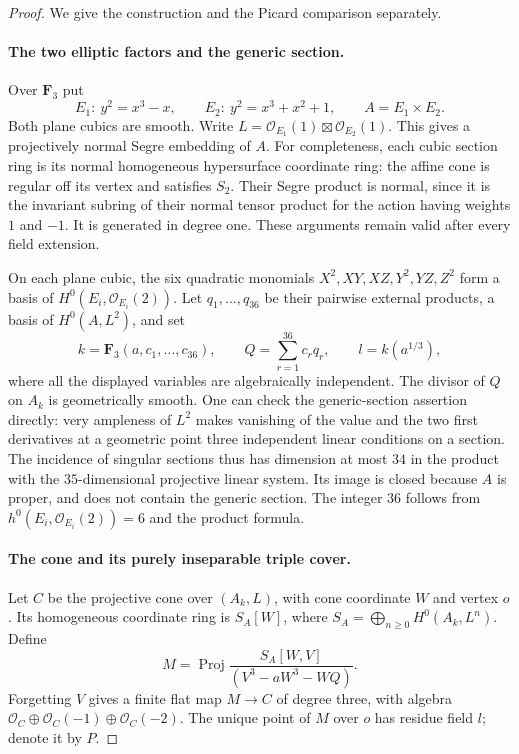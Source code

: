 \begin{proof}
We give the construction and the Picard comparison separately.

\paragraph{The two elliptic factors and the generic section.}
Over $\mathbf F_3$ put
\[
 E_1:\ y^2=x^3-x,\qquad
 E_2:\ y^2=x^3+x^2+1,
 \qquad A=E_1\times E_2.
\]
Both plane cubics are smooth.  Write
$L=\mathcal O_{E_1}(1)\boxtimes\mathcal O_{E_2}(1)$.
This gives a projectively normal Segre embedding of $A$.
For completeness, each cubic section ring is its normal
homogeneous hypersurface coordinate ring: the affine cone is
regular off its vertex and satisfies $S_2$.  Their Segre product
is normal, since it is the invariant subring of their normal
tensor product for the action having weights $1$ and $-1$.
It is generated in degree one.  These arguments remain valid
after every field extension.

On each plane cubic, the six quadratic monomials
$X^2,XY,XZ,Y^2,YZ,Z^2$ form a basis of
$H^0(E_i,\mathcal O_{E_i}(2))$.  Let
$q_1,\ldots,q_{36}$ be their pairwise external products,
a basis of $H^0(A,L^2)$, and set
\[
 k=\mathbf F_3(a,c_1,\ldots,c_{36}),\qquad
 Q=\sum_{r=1}^{36}c_rq_r,
 \qquad l=k(a^{1/3}),
\]
where all the displayed variables are algebraically independent.
The divisor of $Q$ on $A_k$ is geometrically smooth.  One can
check the generic-section assertion directly: very ampleness of
$L^2$ makes vanishing of the value and the two first derivatives
at a geometric point three independent linear conditions on a
section.  The incidence of singular sections thus has dimension
at most $34$ in the product with the $35$-dimensional projective
linear system.  Its image is closed because $A$ is proper, and
does not contain the generic section.  The integer $36$ follows
from $h^0(E_i,\mathcal O_{E_i}(2))=6$ and the product formula.

\paragraph{The cone and its purely inseparable triple cover.}
Let $C$ be the projective cone over $(A_k,L)$, with cone coordinate
$W$ and vertex $o$.  Its homogeneous coordinate ring is
$S_A[W]$, where $S_A=\bigoplus_{n\ge0}H^0(A_k,L^n)$.
Define
\[
 M=\operatorname{Proj}
 \frac{S_A[W,V]}{(V^3-aW^3-WQ)}.
 \tag{B.2.9}
\]
Forgetting $V$ gives a finite flat map $M\to C$ of degree three,
with algebra
$\mathcal O_C\oplus\mathcal O_C(-1)\oplus\mathcal O_C(-2)$.
The unique point of $M$ over $o$ has residue field $l$; denote it
by $P$.


\end{proof}
